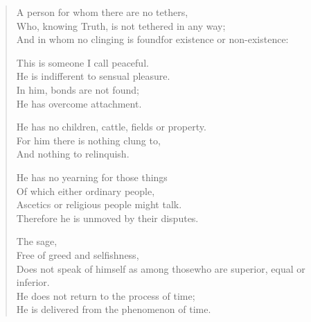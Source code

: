 \begin{verse}
\clearpage

 A person for whom there are no tethers,\\
Who, knowing Truth, is not tethered in any way;\\
And in whom no clinging is found\newline for existence or non-existence:


 This is someone I call peaceful.\\
He is indifferent to sensual pleasure.\\
In him, bonds are not found;\\
He has overcome attachment.


 He has no children, cattle, fields or property.\\
For him there is nothing clung to,\\
And nothing to relinquish.


 He has no yearning for those things\\
Of which either ordinary people,\\
Ascetics or religious people might talk.\\
Therefore he is unmoved by their disputes.


 The sage,\\
Free of greed and selfishness,\\
Does not speak of himself as among those\newline who are superior, equal or inferior.\\
He does not return to the process of time;\\
He is delivered from the phenomenon of time.


\end{verse}
